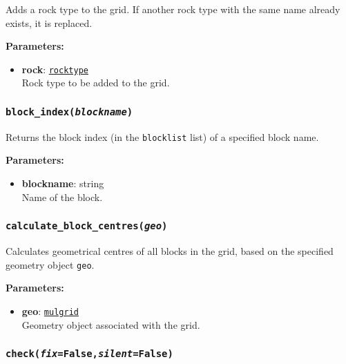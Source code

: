 Adds a rock type to the grid.  If another rock type with the same name already exists, it is replaced.

\textbf{Parameters:}
\begin{itemize}
\item \textbf{rock}: \hyperref[rocktypeobjects]{\texttt{rocktype}}\\
  Rock type to be added to the grid.
\end{itemize}

\begin{snugshade}
\subsubsection{\texttt{block\_index(\emph{blockname})}}
\end{snugshade}
\label{sec:t2grid:block_index}

Returns the block index (in the \texttt{blocklist} list) of a specified block name.

\textbf{Parameters:}
\begin{itemize}
\item \textbf{blockname}: string\\
  Name of the block.
\end{itemize}

\begin{snugshade}
\subsubsection{\texttt{calculate\_block\_centres(\emph{geo})}}
\end{snugshade}
\label{sec:t2grid:calculate_block_centres}

Calculates geometrical centres of all blocks in the grid, based on the specified geometry object \texttt{geo}.

\textbf{Parameters:}
\begin{itemize}
\item \textbf{geo}: \hyperref[mulgrids]{\texttt{mulgrid}}\\
  Geometry object associated with the grid.
\end{itemize}

\begin{snugshade}
\subsubsection{\texttt{check(\emph{fix}=False,\emph{silent}=False)}}
\end{snugshade}
\label{sec:t2grid:check}


